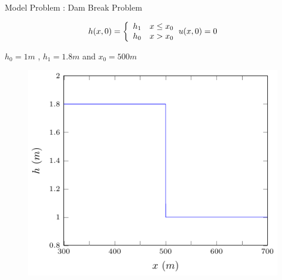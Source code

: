 \documentclass[pdf]{beamer}
\begin{document}
\begin{frame}{Model Problem : Dam Break Problem}
	
   	\begin{minipage}{.4\textwidth}
	\begin{subequations}
		\begin{gather*}
		h(x,0) = \left\lbrace \begin{array}{c c}
		h_1  & x \le x_0\\ h_0  & x > x_0 
		\end{array} \right. 
		\end{gather*}
		\begin{gather*}
		u(x,0) = 0
		\end{gather*}
	\end{subequations} 
   	\end{minipage}%
   	\begin{minipage}{.6\textwidth}
   		\centering
   		$h_0 = 1m$ , $h_1 = 1.8m$ and $x_0 = 500m$
	\begin{figure}
		\includegraphics[width=1\linewidth]{./Pictures/DSW/DBinit.pdf}
	\end{figure}
   	\end{minipage}
	
\end{frame}
\end{document}
